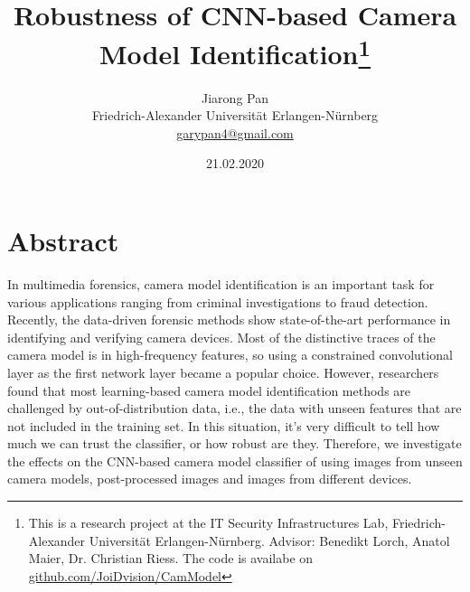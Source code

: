 \documentclass[a4paper, 9pt, twocolumn]{extarticle}
\begin{document}
\date{\normalsize 21.02.2020}

\title{\vspace{-8mm}\textbf{\Large
Robustness of CNN-based Camera Model Identification\footnote{This is a research project at the IT Security Infrastructures Lab, Friedrich-Alexander Universit\"at Erlangen-N\"urnberg. Advisor: Benedikt Lorch, Anatol Maier, Dr. Christian Riess. The code is availabe on \href{https://github.com/JoiDvision/CamModel.git}{github.com/JoiDvision/CamModel} 
}}}

\author{
	{
		\begin{minipage}{\textwidth}
			\center
			Jiarong Pan\\
			\small
			Friedrich-Alexander Universit\"at Erlangen-N\"urnberg
			\protect\\{} %
			\url{garypan4@gmail.com}
		\end{minipage}
	}
}

\maketitle
\thispagestyle{empty}

\section*{Abstract}
\label{section:abstract}

In multimedia forensics, camera model identification is an important task for various applications ranging from criminal investigations to fraud detection. Recently, the data-driven forensic methods show state-of-the-art performance in identifying and verifying camera devices. Most of the distinctive traces of the camera model is in high-frequency features, so using a constrained convolutional layer as the first network layer became a popular choice. However, researchers found that most learning-based camera model identification methods are challenged by out-of-distribution data, i.e., the data with unseen features that are not included in the training set. In this situation, it's very difficult to tell how much we can trust the classifier, or how robust are they. Therefore, we investigate the effects on the CNN-based camera model classifier of using images from unseen camera models,  post-processed images and images from different devices.

\end{document}
